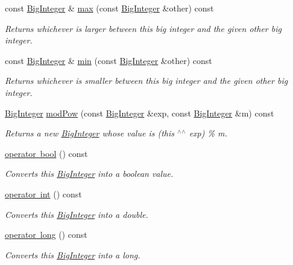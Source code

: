 \begin{DoxyCompactItemize}
const \mbox{\hyperlink{classBigInteger}{Big\+Integer}} \& \mbox{\hyperlink{classBigInteger_a6d3e8559ebe8a6f0c8bebc756f4dd479}{max}} (const \mbox{\hyperlink{classBigInteger}{Big\+Integer}} \&other) const
\begin{DoxyCompactList}\small\item\em Returns whichever is larger between this big integer and the given other big integer. \end{DoxyCompactList}\item 
const \mbox{\hyperlink{classBigInteger}{Big\+Integer}} \& \mbox{\hyperlink{classBigInteger_ae62de36198a0dcb836fd8680e7d71c64}{min}} (const \mbox{\hyperlink{classBigInteger}{Big\+Integer}} \&other) const
\begin{DoxyCompactList}\small\item\em Returns whichever is smaller between this big integer and the given other big integer. \end{DoxyCompactList}\item 
\mbox{\hyperlink{classBigInteger}{Big\+Integer}} \mbox{\hyperlink{classBigInteger_a0784fc13afdca5e439e2cb99dc2b1055}{mod\+Pow}} (const \mbox{\hyperlink{classBigInteger}{Big\+Integer}} \&exp, const \mbox{\hyperlink{classBigInteger}{Big\+Integer}} \&m) const
\begin{DoxyCompactList}\small\item\em Returns a new \mbox{\hyperlink{classBigInteger}{Big\+Integer}} whose value is (this $^\wedge$$^\wedge$ exp) \% m. \end{DoxyCompactList}\item 
\mbox{\hyperlink{classBigInteger_a67b76affb3b5d35fa419ac234144038b}{operator bool}} () const
\begin{DoxyCompactList}\small\item\em Converts this \mbox{\hyperlink{classBigInteger}{Big\+Integer}} into a boolean value. \end{DoxyCompactList}\item 
\mbox{\hyperlink{classBigInteger_a48d27bd92e68c69527589ea65a9af69f}{operator int}} () const
\begin{DoxyCompactList}\small\item\em Converts this \mbox{\hyperlink{classBigInteger}{Big\+Integer}} into a double. \end{DoxyCompactList}\item 
\mbox{\hyperlink{classBigInteger_ad7ce59321a0dd63e7f1fab6dceabe53b}{operator long}} () const
\begin{DoxyCompactList}\small\item\em Converts this \mbox{\hyperlink{classBigInteger}{Big\+Integer}} into a long. \end{DoxyCompactList}\item 

\end{DoxyCompactItemize}
